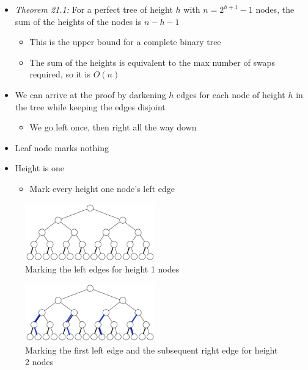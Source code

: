 \documentclass[
  10pt,
  english,
  letterpaper,
,tablecaptionabove
]{scrartcl}
\providecommand{\tightlist}{%
  \setlength{\itemsep}{0pt}\setlength{\parskip}{0pt}}
\begin{document}
\begin{itemize}
\tightlist
\item
  \emph{Theorem 21.1:} For a perfect tree of height \(h\) with
  \(n = 2^{h+1} - 1\) nodes, the sum of the heights of the nodes is
  \(n-h-1\)

  \begin{itemize}
  \tightlist
  \item
    This is the upper bound for a complete binary tree
  \item
    The sum of the heights is equivalent to the max number of swaps
    required, so it is \(O(n)\)
  \end{itemize}
\item
  We can arrive at the proof by darkening \(h\) edges for each node of
  height \(h\) in the tree while keeping the edges disjoint

  \begin{itemize}
  \tightlist
  \item
    We go left once, then right all the way down
  \end{itemize}
\item
  Leaf node marks nothing
\item
  Height is one

  \begin{itemize}
  \tightlist
  \item
    Mark every height one node's left edge
  \end{itemize}
\end{itemize}

\begin{figure}
\centering
\includegraphics[width=0.5\textwidth,height=\textheight]{images/6.png}
\caption{Marking the left edges for height 1 nodes}
\end{figure}

\begin{figure}
\centering
\includegraphics[width=0.5\textwidth,height=\textheight]{images/7.png}
\caption{Marking the first left edge and the subsequent right edge for
height 2 nodes}
\end{figure}
\end{document}
